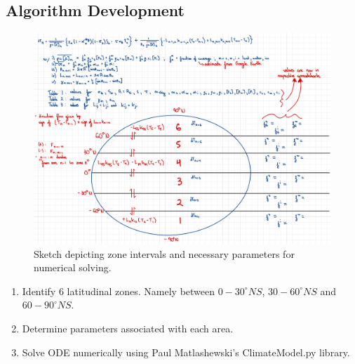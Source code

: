 \documentclass[12pt]{article}
\begin{document}
\subsection{Algorithm Development}

\begin{figure}[H]
    \centering
    \includegraphics[scale=0.3]{Graphicalg.pdf}
    \caption{
        Sketch depicting zone intervals and necessary parameters for numerical
        solving.
    }
    \label{fig:graphicalg}
\end{figure}
\FloatBarrier

\begin{enumerate}
    \item Identify 6 latitudinal zones. Namely between $0-30^{\circ}NS$,
    $30-60^{\circ}NS$ and $60-90^{\circ}NS$.
    \item Determine parameters associated with each area.
    \item Solve ODE numerically using Paul Matlashewski's
    ClimateModel.py library.  
\end{enumerate}

\end{document}
